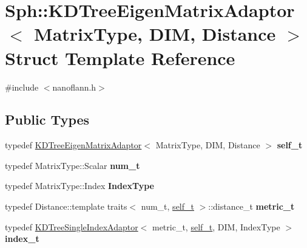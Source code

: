 \hypertarget{structSph_1_1KDTreeEigenMatrixAdaptor}{}\section{Sph\+:\+:K\+D\+Tree\+Eigen\+Matrix\+Adaptor$<$ Matrix\+Type, D\+IM, Distance $>$ Struct Template Reference}
\label{structSph_1_1KDTreeEigenMatrixAdaptor}


{\ttfamily \#include $<$nanoflann.\+h$>$}

\subsection*{Public Types}
\begin{DoxyCompactItemize}
\item 
\hypertarget{structSph_1_1KDTreeEigenMatrixAdaptor_adacdae55d3f287c0bfd67524b0f1ae4c}{}\label{structSph_1_1KDTreeEigenMatrixAdaptor_adacdae55d3f287c0bfd67524b0f1ae4c} 
typedef \hyperlink{structSph_1_1KDTreeEigenMatrixAdaptor}{K\+D\+Tree\+Eigen\+Matrix\+Adaptor}$<$ Matrix\+Type, D\+IM, Distance $>$ {\bfseries self\+\_\+t}
\item 
\hypertarget{structSph_1_1KDTreeEigenMatrixAdaptor_ad578c10e7eccabf1feebda462881fb0a}{}\label{structSph_1_1KDTreeEigenMatrixAdaptor_ad578c10e7eccabf1feebda462881fb0a} 
typedef Matrix\+Type\+::\+Scalar {\bfseries num\+\_\+t}
\item 
\hypertarget{structSph_1_1KDTreeEigenMatrixAdaptor_a75133f75c59ed0607301a96d560c082a}{}\label{structSph_1_1KDTreeEigenMatrixAdaptor_a75133f75c59ed0607301a96d560c082a} 
typedef Matrix\+Type\+::\+Index {\bfseries Index\+Type}
\item 
\hypertarget{structSph_1_1KDTreeEigenMatrixAdaptor_aec2b2f7951d75aa359cf1d2c6823481c}{}\label{structSph_1_1KDTreeEigenMatrixAdaptor_aec2b2f7951d75aa359cf1d2c6823481c} 
typedef Distance\+::template traits$<$ num\+\_\+t, \hyperlink{structSph_1_1KDTreeEigenMatrixAdaptor}{self\+\_\+t} $>$\+::distance\+\_\+t {\bfseries metric\+\_\+t}
\item 
\hypertarget{structSph_1_1KDTreeEigenMatrixAdaptor_abdf6e5a32b79f2640eb982cdbaf321e5}{}\label{structSph_1_1KDTreeEigenMatrixAdaptor_abdf6e5a32b79f2640eb982cdbaf321e5} 
typedef \hyperlink{classSph_1_1KDTreeSingleIndexAdaptor}{K\+D\+Tree\+Single\+Index\+Adaptor}$<$ metric\+\_\+t, \hyperlink{structSph_1_1KDTreeEigenMatrixAdaptor}{self\+\_\+t}, D\+IM, Index\+Type $>$ {\bfseries index\+\_\+t}
\end{DoxyCompactItemize}
